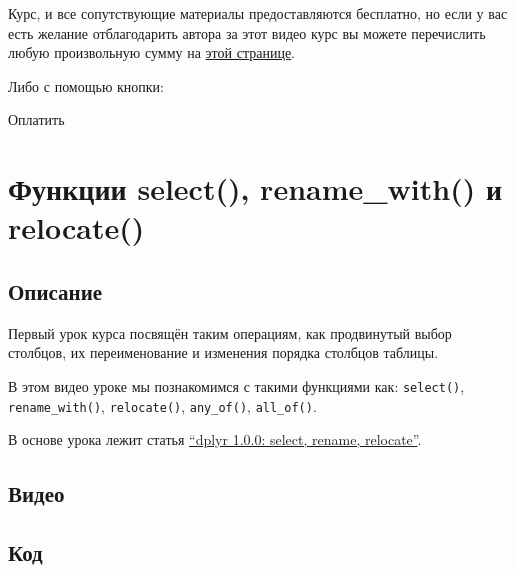 \documentclass[
]{book}
\begin{document}
Курс, и все сопутствующие материалы предоставляются бесплатно, но если у вас есть желание отблагодарить автора за этот видео курс вы можете перечислить любую произвольную сумму на \href{https://secure.wayforpay.com/payment/r4excel_users}{этой странице}.

Либо с помощью кнопки:

{Оплатить}

\hypertarget{ux444ux443ux43dux43aux446ux438ux438-select-rename_with-ux438-relocate}{%
\chapter{Функции select(), rename\_with() и relocate()}\label{ux444ux443ux43dux43aux446ux438ux438-select-rename_with-ux438-relocate}}

\hypertarget{ux43eux43fux438ux441ux430ux43dux438ux435}{%
\section{Описание}\label{ux43eux43fux438ux441ux430ux43dux438ux435}}

Первый урок курса посвящён таким операциям, как продвинутый выбор столбцов, их переименование и изменения порядка столбцов таблицы.

В этом видео уроке мы познакомимся с такими функциями как: \texttt{select()}, \texttt{rename\_with()}, \texttt{relocate()}, \texttt{any\_of()}, \texttt{all\_of()}.

В основе урока лежит статья \href{https://www.tidyverse.org/blog/2020/03/dplyr-1-0-0-select-rename-relocate/}{``dplyr 1.0.0: select, rename, relocate''}.

\hypertarget{ux432ux438ux434ux435ux43e}{%
\section{Видео}\label{ux432ux438ux434ux435ux43e}}

\hypertarget{ux43aux43eux434}{%
\section{Код}\label{ux43aux43eux434}}
\end{document}
